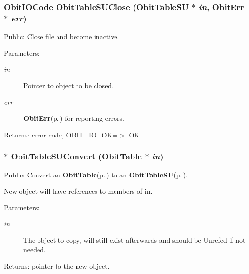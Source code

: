 \subsubsection{\setlength{\rightskip}{0pt plus 5cm}Obit\-IOCode Obit\-Table\-SUClose ({\bf Obit\-Table\-SU} $\ast$ {\em in}, {\bf Obit\-Err} $\ast$ {\em err})}\label{ObitTableSU_8c_a25}


Public: Close file and become inactive. 

\begin{Desc}
\item[Parameters:]
\begin{description}
\item[{\em in}]Pointer to object to be closed. \item[{\em err}]{\bf Obit\-Err}{\rm (p.\,\pageref{structObitErr})} for reporting errors. \end{description}
\end{Desc}
\begin{Desc}
\item[Returns:]error code, OBIT\_\-IO\_\-OK=$>$ OK \end{Desc}
\subsubsection{$\ast$ Obit\-Table\-SUConvert ({\bf Obit\-Table} $\ast$ {\em in})}\label{ObitTableSU_8c_a19}


Public: Convert an {\bf Obit\-Table}{\rm (p.\,\pageref{structObitTable})} to an {\bf Obit\-Table\-SU}{\rm (p.\,\pageref{structObitTableSU})}. 

New object will have references to members of in. \begin{Desc}
\item[Parameters:]
\begin{description}
\item[{\em in}]The object to copy, will still exist afterwards and should be Unrefed if not needed. \end{description}
\end{Desc}
\begin{Desc}
\item[Returns:]pointer to the new object. \end{Desc}
